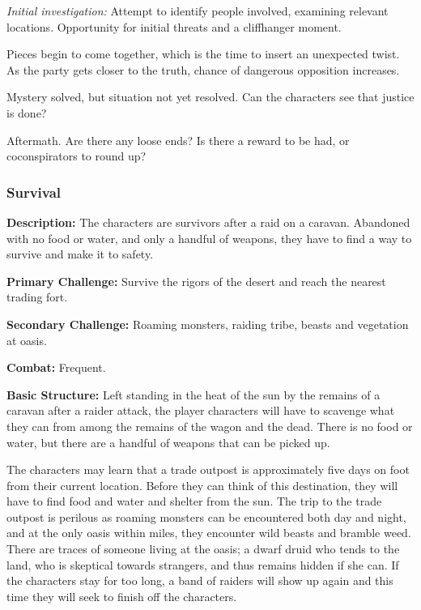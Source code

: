 \textit{Initial investigation:} Attempt to identify people involved, examining relevant locations. Opportunity for initial threats and a cliffhanger moment.

Pieces begin to come together, which is the time to insert an unexpected twist. As the party gets closer to the truth, chance of dangerous opposition increases.

Mystery solved, but situation not yet resolved. Can the characters see that justice is done? 

Aftermath. Are there any loose ends? Is there a reward to be had, or coconspirators to round up?

\subsubsection{Survival}

\textbf{Description:} The characters are survivors after a raid on a caravan. Abandoned with no food or water, and only a handful of weapons, they have to find a way to survive and make it to safety.

\textbf{Primary Challenge:} Survive the rigors of the desert and reach the nearest trading fort.

\textbf{Secondary Challenge:} Roaming monsters, raiding tribe, beasts and vegetation at oasis.

\textbf{Combat:} Frequent.

\textbf{Basic Structure:} Left standing in the heat of the sun by the remains of a caravan after a raider attack, the player characters will have to scavenge what they can from among the remains of the wagon and the dead. There is no food or water, but there are a handful of weapons that can be picked up.

The characters may learn that a trade outpost is approximately five days on foot from their current location. Before they can think of this destination, they will have to find food and water and shelter from the sun. The trip to the trade outpost is perilous as roaming monsters can be encountered both day and night, and at the only oasis within miles, they encounter wild beasts and bramble weed. There are traces of someone living at the oasis; a dwarf druid who tends to the land, who is skeptical towards strangers, and thus remains hidden if she can. If the characters stay for too long, a band of raiders will show up again and this time they will seek to finish off the characters.


